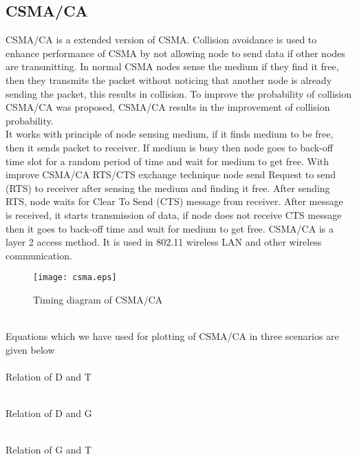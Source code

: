 \documentclass[11pt, conference, compsocconf, onecolumn]{IEEEtran}
\begin{document}
\subsection{CSMA/CA}
CSMA/CA is a extended version of CSMA. Collision avoidance is used to enhance performance of CSMA by not allowing node to send data if other nodes are transmitting. In normal CSMA nodes sense the medium if they find it free, then they transmits the packet without noticing that another node is already sending the packet, this results in collision. To improve the probability of collision CSMA/CA was proposed, CSMA/CA results in the improvement of collision probability.\\
\indent It works with principle of node sensing medium, if it finds medium to be free, then it sends packet to receiver. If medium is busy then node goes to back-off time slot for a random period of time and wait for medium to get free. With improve CSMA/CA RTS/CTS exchange technique node send Request to send (RTS) to receiver after sensing the medium and finding it free. After sending RTS, node waits
for Clear To Send (CTS) message from receiver. After message is received, it starts transmission of data, if node does not receive CTS message
then it goes to back-off time and wait for medium to get free. CSMA/CA is a layer 2 access method.  It is used in 802.11 wireless LAN and other wireless communication.
\begin{figure}[!h]
\centering
\caption{Timing diagram of CSMA/CA}
\texttt{[image: csma.eps]}
\end{figure}
\\
Equations which we have used for plotting of CSMA/CA in three scenarios are given below
\\\\
Relation of D and T

\\
Relation of D and G

\\
Relation of G and T
\end{document}

